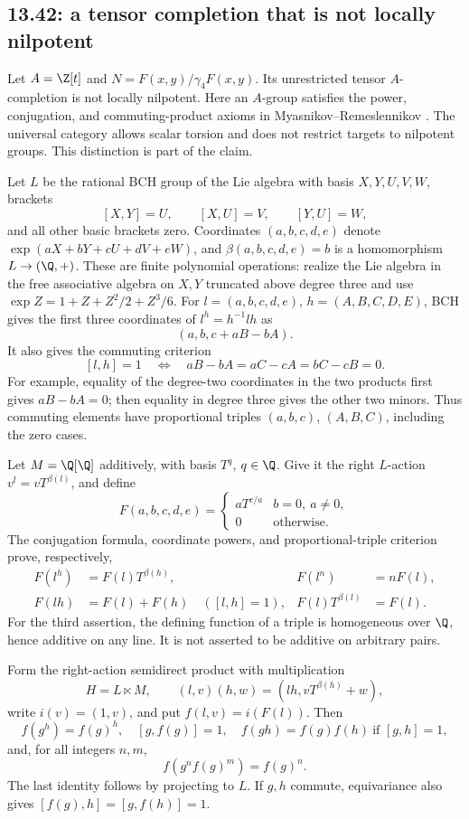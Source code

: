 \subsection{13.42: a tensor completion that is not locally nilpotent}
\label{cand:13.42}
Let \(A=\Z[t]\) and \(N=F(x,y)/\gamma_4F(x,y)\).
Its unrestricted tensor \(A\)-completion is not locally nilpotent.
Here an \(A\)-group satisfies the power, conjugation, and
commuting-product axioms in Myasnikov--Remeslennikov
\cite[Definitions~1--2]{exponential-groups}.
The universal category allows scalar torsion and does not restrict
targets to nilpotent groups. This distinction is part of the claim.

Let \(L\) be the rational BCH group of the Lie algebra with basis
\(X,Y,U,V,W\), brackets
\[
 [X,Y]=U,\qquad [X,U]=V,\qquad [Y,U]=W,
\]
and all other basic brackets zero.
Coordinates \((a,b,c,d,e)\) denote
\(\exp(aX+bY+cU+dV+eW)\), and \(\beta(a,b,c,d,e)=b\) is a
homomorphism \(L\to(\Q,+)\).
These are finite polynomial operations: realize the Lie algebra in
the free associative algebra on \(X,Y\) truncated above degree three
and use \(\exp Z=1+Z+Z^2/2+Z^3/6\).
For \(l=(a,b,c,d,e)\), \(h=(A,B,C,D,E)\), BCH gives the first
three coordinates of \(l^h=h^{-1}lh\) as
\[
 (a,b,c+aB-bA).
\]
It also gives the commuting criterion
\[
 [l,h]=1\quad\Longleftrightarrow\quad
 aB-bA=aC-cA=bC-cB=0.
\]
For example, equality of the degree-two coordinates in the two
products first gives \(aB-bA=0\); then equality in degree three
gives the other two minors. Thus commuting elements have proportional
triples \((a,b,c)\), \((A,B,C)\), including the zero cases.

Let \(M=\Q[\Q]\) additively, with basis \(T^q\), \(q\in\Q\).
Give it the right \(L\)-action \(v^l=vT^{\beta(l)}\), and define
\[
 F(a,b,c,d,e)=
 \begin{cases}aT^{c/a}&b=0,\ a\ne0,\\0&\text{otherwise}.\end{cases}
\]
The conjugation formula, coordinate powers, and proportional-triple
criterion prove, respectively,
\[
 \begin{aligned}
 F(l^h)&=F(l)T^{\beta(h)},&
 F(l^n)&=nF(l),\\
 F(lh)&=F(l)+F(h)\quad([l,h]=1),&
 F(l)T^{\beta(l)}&=F(l).
 \end{aligned}
\]
For the third assertion, the defining function of a triple is
homogeneous over \(\Q\), hence additive on any line.
It is not asserted to be additive on arbitrary pairs.

Form the right-action semidirect product with multiplication
\[
 H=L\ltimes M,\qquad (l,v)(h,w)=(lh,vT^{\beta(h)}+w),
\]
write \(i(v)=(1,v)\), and put \(f(l,v)=i(F(l))\).
Then
\[
 f(g^h)=f(g)^h,\quad [g,f(g)]=1,\quad
 f(gh)=f(g)f(h)\ \text{if }[g,h]=1,
\]
and, for all integers \(n,m\),
\[
 f(g^nf(g)^m)=f(g)^n.
\]
The last identity follows by projecting to \(L\).
If \(g,h\) commute, equivariance also gives
\([f(g),h]=[g,f(h)]=1\).

